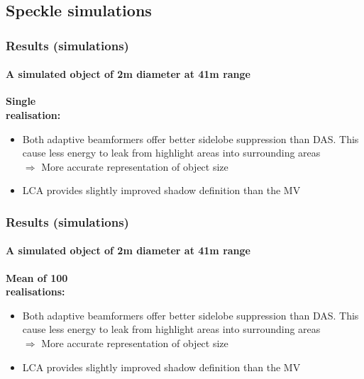 \documentclass[
    beamer                                       %
 , xelatex                                      %
]{common/mytemplate}
\begin{document}
\subsection{Speckle simulations}
\begin{frame}
\frametitle{Results (simulations)}
\framesubtitle{A simulated object of 2m diameter at 41m range}
\vspace{-3pt}
\begin{figure}[H]
\mbox{}\hfill{}
\end{figure}
\vspace{-110pt}
\parbox[t]{0.15\linewidth}{\bf\color{blue}\centering Single\\realisation:}
\vspace{60pt}
\begin{itemize}
\item Both adaptive beamformers offer better sidelobe suppression than DAS. This cause less energy to leak from highlight areas into surrounding areas\\$\Rightarrow$ More accurate representation of object size
\item LCA provides slightly improved shadow definition than the MV
\end{itemize}
\end{frame}


\begin{frame}
\frametitle{Results (simulations)}
\framesubtitle{A simulated object of 2m diameter at 41m range}
\vspace{-3pt}
\begin{figure}[H]
\mbox{}\hfill{}
\end{figure}
\vspace{-110pt}
\parbox[t]{0.25\linewidth}{\bf\color{blue}\centering Mean of 100\\realisations:}
\vspace{60pt}
\begin{itemize}
\item Both adaptive beamformers offer better sidelobe suppression than DAS. This cause less energy to leak from highlight areas into surrounding areas\\$\Rightarrow$ More accurate representation of object size
\item LCA provides slightly improved shadow definition than the MV
\end{itemize}
\end{frame}
\end{document}
